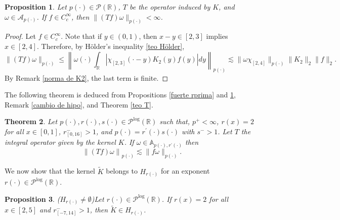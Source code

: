 \documentclass[a4paper,11pt,reqno]{amsart}
\theoremstyle{plain}
\numberwithin{equation}{section}
\newtheorem{teo}{Theorem}[section]
\newtheorem{propo}[teo]{Proposition}
\theoremstyle{definition}
\begin{document}
\begin{propo}\label{lado izq finito K}
	Let $p(\cdot)\in \mathcal{P}(\mathbb{R})$, $T$ be the operator induced by $K$, and $\omega\in \mathcal{A}_{p(\cdot)}$. If $f\in C^\infty_c$, then $\|(Tf)\omega\|_{p(\cdot)}<\infty$.
\end{propo}
\begin{proof}
	Let $f\in C^\infty_c$. Note that if $y\in(0,1)$, then $x-y\in [2,3]$ implies $x\in[2,4]$. Therefore, by Hölder's inequality \ref{teo Hölder},
	\begin{equation*}
		\|(Tf)\omega\|_{p(\cdot)}\leq \left\|\omega(\cdot)\int_{\mathbb{R}}|\chi_{[2,3]}(\cdot-y)K_2(y)f(y)|dy\right\|_{p(\cdot)}\lesssim\|\omega\chi_{[2,4]}\|_{p(\cdot)}\|K_2\|_2\|f\|_2.
	\end{equation*}
	By Remark \ref{norma de K2}, the last term is finite.
\end{proof}

The following theorem is deduced from Propositions \ref{fuerte rprima} and \ref{lado izq finito K}, Remark \ref{cambio de hipo}, and Theorem \ref{teo T}.
\begin{teo}
	Let ${p(\cdot)},{r(\cdot)},s(\cdot)\in\mathcal{P}^{\log}(\mathbb{R})$ such that, $p^+<\infty$, $r(x)=2$ for all $x\in[0,1]$, $r^-_{[0,16]}>1$, and ${p(\cdot)}={r^\prime(\cdot)}{s(\cdot)}$ with $s^->1$. Let $T$ the integral operator given by the kernel $K$. If $\omega\in \mathbb{A}_{{p(\cdot)},{r^\prime(\cdot)}}$ then  
	$$\left\|(T f)\omega\right\|_{p(\cdot)}\lesssim \|f\omega\|_{p(\cdot)}.$$
	
\end{teo}
We now show that the kernel $\tilde{K}$ belongs to $H_{r(\cdot)}$ for an exponent $r(\cdot)\in\mathcal{P}^{\text{log}}(\mathbb{R})$.


\begin{propo} ($H_{r(\cdot)}\neq\emptyset$)\label{ejemplo de núcleo en Hr} Let $r(\cdot)\in\mathcal{P}^{\text{log}}(\mathbb{R})$. If $r(x)=2$ for all $x\in\left[2,5\right]$ and $r^-_{[-7,14]}>1$, then $\tilde{K}\in H_{r(\cdot)}$.
	
\end{propo}
\end{document}
